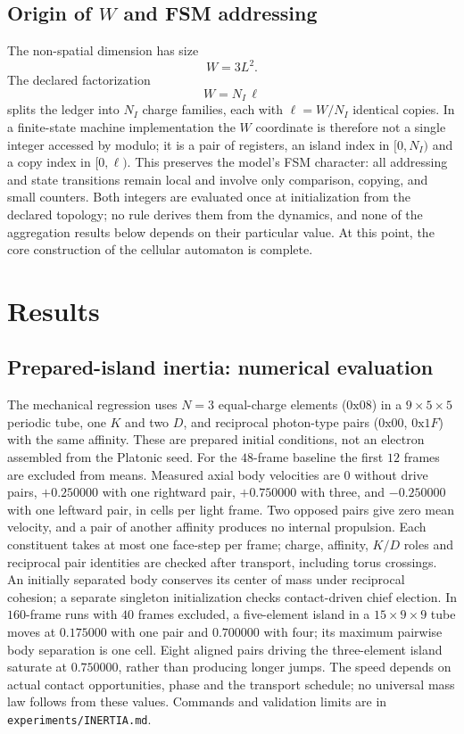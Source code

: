 \documentclass{ijuc}
\begin{document}
\subsection{Origin of $W$ and FSM addressing}
The non-spatial dimension has size
\begin{equation}
W = 3L^2.
\end{equation}
The declared factorization
\begin{equation}
W = N_I\,\ell
\end{equation}
splits the ledger into $N_{I}$ charge families, each with $\ell=W/N_I$ identical copies. In a finite-state machine implementation the $W$ coordinate is therefore not a single integer accessed by modulo; it is a pair of registers, an island index in $[0,N_I)$ and a copy index in $[0,\ell)$. This preserves the model's FSM character: all addressing and state transitions remain local and involve only comparison, copying, and small counters.  Both integers are evaluated once at initialization from the declared topology; no rule derives them from the dynamics, and none of the aggregation results below depends on their particular value.
At this point, the core construction of the cellular automaton is complete.
\section{Results}\label{sec:Results}
\subsection{Prepared-island inertia: numerical evaluation}\label{subsec:inertia-validation}
The mechanical regression uses $N=3$ equal-charge elements ($0\mathrm{x}08$) in a $9\times5\times5$ periodic tube, one $K$ and two $D$, and reciprocal photon-type pairs ($0\mathrm{x}00$, $0\mathrm{x}1F$) with the same affinity. These are prepared initial conditions, not an electron assembled from the Platonic seed. For the $48$-frame baseline the first $12$ frames are excluded from means. Measured axial body velocities are $0$ without drive pairs, $+0.250000$ with one rightward pair, $+0.750000$ with three, and $-0.250000$ with one leftward pair, in cells per light frame. Two opposed pairs give zero mean velocity, and a pair of another affinity produces no internal propulsion. Each constituent takes at most one face-step per frame; charge, affinity, $K/D$ roles and reciprocal pair identities are checked after transport, including torus crossings. An initially separated body conserves its center of mass under reciprocal cohesion; a separate singleton initialization checks contact-driven chief election.
In $160$-frame runs with $40$ frames excluded, a five-element island in a $15\times9\times9$ tube moves at $0.175000$ with one pair and $0.700000$ with four; its maximum pairwise body separation is one cell. Eight aligned pairs driving the three-element island saturate at $0.750000$, rather than producing longer jumps. The speed depends on actual contact opportunities, phase and the transport schedule; no universal mass law follows from these values. Commands and validation limits are in \texttt{experiments/INERTIA.md}.
\end{document}
